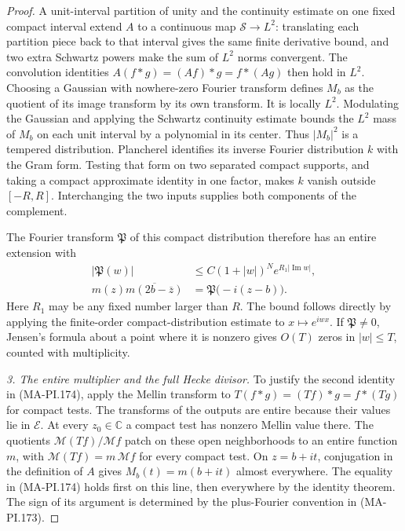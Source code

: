 \begin{proof}
A unit-interval partition of unity and the continuity
estimate on one fixed compact interval extend \(A\)
to a continuous map \(\mathcal S\to L^2\): translating
each partition piece back to that interval gives the
same finite derivative bound, and two extra Schwartz
powers make the sum of \(L^2\) norms convergent.
The convolution identities
\(A(f*g)=(Af)*g=f*(Ag)\) then hold in \(L^2\).
Choosing a Gaussian with nowhere-zero Fourier transform
defines \(M_b\) as the quotient of its image transform
by its own transform.  It is locally \(L^2\).
Modulating the Gaussian and applying the Schwartz
continuity estimate bounds the \(L^2\) mass of \(M_b\)
on each unit interval by a polynomial in its center.
Thus \(|M_b|^2\) is a tempered distribution.
Plancherel identifies its inverse Fourier distribution
\(k\) with the Gram form.  Testing that form on two
separated compact supports, and taking a compact
approximate identity in one factor, makes \(k\)
vanish outside \([-R,R]\).  Interchanging the two
inputs supplies both components of the complement.

The Fourier transform \(\mathfrak P\) of this compact
distribution therefore has an entire extension with
\[
 \begin{aligned}
 |\mathfrak P(w)|
   &\le C(1+|w|)^N e^{R_1|\operatorname{Im}w|},\\
 m(z)\overline{m(2b-\overline z)}
   &=\mathfrak P\bigl(-i(z-b)\bigr).
 \end{aligned}
 \tag{MA-PI.174}
\]
Here \(R_1\) may be any fixed number larger than \(R\).
The bound follows directly by applying the finite-order
compact-distribution estimate to \(x\mapsto e^{iwx}\).
If \(\mathfrak P\ne0\), Jensen's formula about a point
where it is nonzero gives \(O(T)\) zeros in \(|w|\le T\),
counted with multiplicity.

\emph{3. The entire multiplier and the full Hecke divisor.}
To justify the second identity in (MA-PI.174), apply the
Mellin transform to
\(T(f*g)=(Tf)*g=f*(Tg)\) for compact tests.
The transforms of the outputs are entire because their
values lie in \(\mathcal E\).
At every \(z_0\in\mathbb C\) a compact test has nonzero
Mellin value there.  The quotients
\(\mathcal M(Tf)/\mathcal Mf\) patch on these open
neighborhoods to an entire function \(m\), with
\(\mathcal M(Tf)=m\,\mathcal Mf\) for every compact test.
On \(z=b+it\), conjugation in the definition of \(A\)
gives \(M_b(t)=m(b+it)\) almost everywhere.
The equality in (MA-PI.174) holds first on this line,
then everywhere by the identity theorem.
The sign of its argument is determined by the
plus-Fourier convention in (MA-PI.173).


\end{proof}

